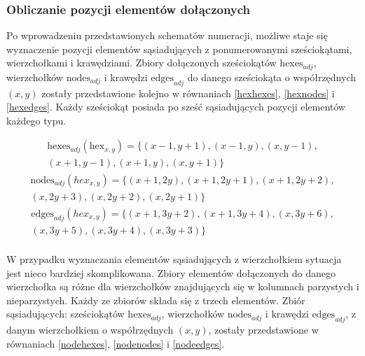 \documentclass[a4paper,12pt]{article}
\begin{document}
\subsubsection{Obliczanie pozycji elementów dołączonych}
\label{sec:calculations}
Po wprowadzeniu przedstawionych schematów numeracji, możliwe staje się
wyznaczenie pozycji elementów sąsiadujących z ponumerowanymi
sześciokątami, wierzchołkami i krawędziami. Zbiory dołączonych
sześciokątów $\text{hexes}_{adj}$, wierzchołków $\text{nodes}_{adj}$ i
krawędzi $\text{edges}_{adj}$ do danego sześciokąta o współrzędnych
$(x, y)$ zostały przedstawione kolejno w równaniach \ref{hexhexes},
\ref{hexnodes} i \ref{hexedges}. Każdy sześciokąt posiada po sześć
sąsiadujących pozycji elementów każdego typu.

\begin{equation}
  \begin{aligned}
    \text{hexes}_{adj}(\text{hex}_{x,y})=
    \{
    (x-1, y+1),
    (x-1, y),
    (x, y-1),\\
    (x+1, y-1),
    (x+1, y),
    (x, y+1)
    \}
  \end{aligned}
  \label{hexhexes}
\end{equation}
\begin{equation}
  \begin{aligned}
    \text{nodes}_{adj}(hex_{x,y})=\{
    (x+1, 2y),
    (x+1, 2y+1),
    (x+1, 2y+2),\\
    (x, 2y+3),
    (x, 2y+2),
    (x, 2y+1)
    \}
  \end{aligned}
  \label{hexnodes}
\end{equation}
\begin{equation}
  \begin{aligned}
    \text{edges}_{adj}(hex_{x,y})=\{
    (x+1, 3y+2),
    (x+1, 3y+4),
    (x, 3y+6),\\
    (x, 3y+5),
    (x, 3y+4),
    (x, 3y+3)
    \}
  \end{aligned}
  \label{hexedges}
\end{equation} \\

W przypadku wyznaczania elementów sąsiadujących z wierzchołkiem
sytuacja jest nieco bardziej skomplikowana. Zbiory elementów
dołączonych do danego wierzchołka są różne dla wierzchołków
znajdujących się w kolumnach parzystych i nieparzystych. Każdy ze
zbiorów składa się z trzech elementów. Zbiór sąsiadujących:
sześciokątów $\text{hexes}_{adj}$, wierzchołków $\text{nodes}_{adj}$ i
krawędzi $\text{edges}_{adj}$, z danym wierzchołkiem o współrzędnych
$(x, y)$, zostały przedstawione w równaniach \ref{nodehexes},
\ref{nodenodes} i \ref{nodeedges}.
\end{document}
